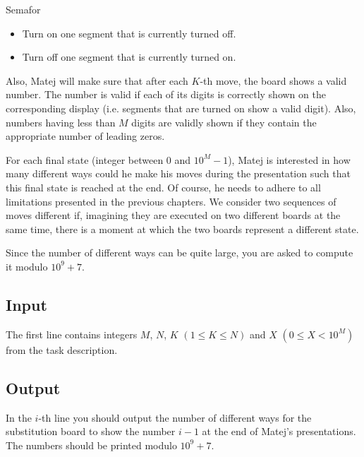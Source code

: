 \begin{statement}[
  problempoints=100,
  timelimit=4 seconds,
  memorylimit=512 MiB,
]{Semafor}
\begin{itemize}
    \item Turn on one segment that is currently turned off.
    \item Turn off one segment that is currently turned on.
\end{itemize}

Also, Matej will make sure that after each $K$-th move, the board shows a valid
number. The number is valid if each of its digits is correctly shown on the
corresponding display (i.e. segments that are turned on show a valid digit).
Also, numbers having less than $M$ digits are validly shown if they contain
the appropriate number of leading zeros.

For each final state (integer between $0$ and $10^M-1$), Matej is interested
in how many different ways could he make his moves during the presentation such
that this final state is reached at the end. Of course, he needs to adhere to
all limitations presented in the previous chapters. We consider two sequences
of moves different if, imagining they are executed on two different boards
at the same time, there is a moment at which the two boards represent a different
state.

Since the number of different ways can be quite large, you are asked to compute
it modulo $10^9+7$.
\clearpage

\subsection*{Input}
The first line contains integers $M$, $N$, $K$ $(1 \le K \le N)$ and $X$ $(0
\le X < 10^M)$ from the task description.

\subsection*{Output}
In the $i$-th line you should output the number of different ways for the
substitution board to show the number $i-1$ at the end of Matej's presentations.
The numbers should be printed modulo $10^9 + 7$.


\end{statement}
